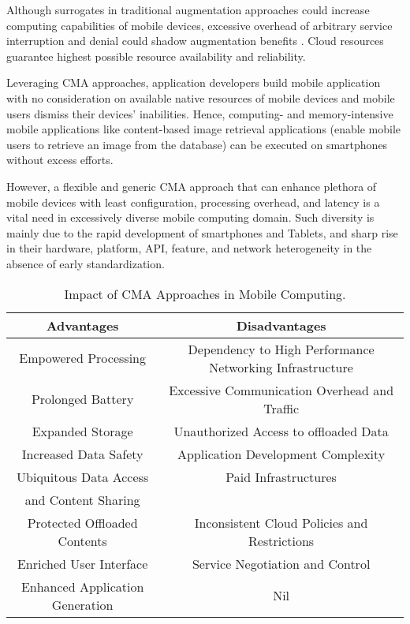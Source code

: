 \documentclass[publish]{IEEEtran}
\begin{document}
Although surrogates in traditional augmentation approaches \cite{Balana,Balan2002cyber,Balan2006,Flinnc} could increase computing capabilities of mobile devices, excessive overhead of arbitrary service interruption and denial could shadow augmentation benefits \cite{Sharifi2011,Shiraz2012c}. Cloud resources guarantee highest possible resource availability and reliability.
 
Leveraging CMA approaches, application developers build mobile application with no consideration on available native resources of mobile devices and mobile users dismiss their devices' inabilities. Hence, computing- and memory-intensive mobile applications like content-based image retrieval applications (enable mobile users to retrieve an image from the database) can be executed on smartphones without excess efforts. 

However, a flexible and generic CMA approach that can enhance plethora of mobile devices with least configuration, processing overhead, and latency is a vital need in excessively diverse mobile computing domain. Such diversity is mainly due to the rapid development of smartphones and Tablets, and sharp rise in their hardware, platform, API, feature, and network heterogeneity \cite{ZohrehSanaei2012} in the absence of early standardization. 

\begin{table*} [t]
\centering
\caption{Impact of CMA Approaches in Mobile Computing.} \label{Impacts}
\begin{tabular}{|c|c|}

\hline   Advantages & Disadvantages \\ 
\hline   Empowered Processing & Dependency to High Performance Networking Infrastructure \\ 
\hline   Prolonged Battery & Excessive Communication Overhead and Traffic\\ 
\hline   Expanded Storage &  Unauthorized Access to offloaded Data \\ 
\hline   Increased Data Safety &   Application Development Complexity\\ 
\hline   Ubiquitous Data Access  & Paid Infrastructures\\ 
and Content Sharing & \\ 
\hline   Protected Offloaded Contents &  Inconsistent Cloud Policies and Restrictions \\ 
\hline   Enriched User Interface &  Service Negotiation and Control\\ 
\hline   Enhanced Application Generation & Nil \\ 
\hline 
\end{tabular} 
\end{table*}
\end{document}
